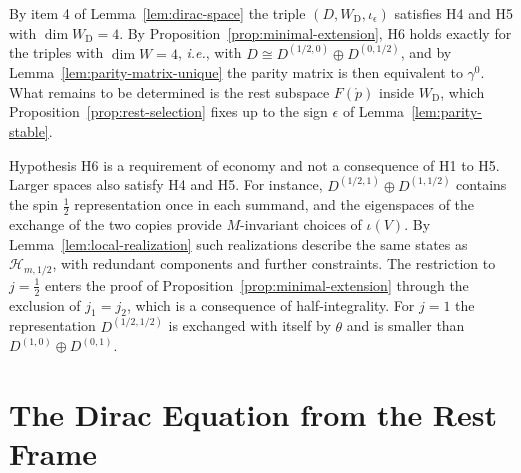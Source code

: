 \begin{remark}\label{rem:minimality-choice}
	By item 4 of Lemma~\ref{lem:dirac-space} the triple $(D,W_{\mathrm{D}},\iota_\epsilon)$ satisfies H4 and H5 with $\dim W_{\mathrm{D}}=4$. By Proposition~\ref{prop:minimal-extension}, H6 holds exactly for the triples with $\dim W=4$, \textit{i.e.}, with $D\cong D^{(1/2,0)}\oplus D^{(0,1/2)}$, and by Lemma~\ref{lem:parity-matrix-unique} the parity matrix is then equivalent to $\gamma^0$. What remains to be determined is the rest subspace $F(\mathring{p})$ inside $W_{\mathrm{D}}$, which Proposition~\ref{prop:rest-selection} fixes up to the sign $\epsilon$ of Lemma~\ref{lem:parity-stable}.
	
	Hypothesis H6 is a requirement of economy and not a consequence of H1 to H5. Larger spaces also satisfy H4 and H5. For instance, $D^{(1/2,1)}\oplus D^{(1,1/2)}$ contains the spin $\frac12$ representation once in each summand, and the eigenspaces of the exchange of the two copies provide $M$-invariant choices of $\iota(V)$. By Lemma~\ref{lem:local-realization} such realizations describe the same states as $\mathcal{H}_{m,1/2}$, with redundant components and further constraints. The restriction to $j=\frac12$ enters the proof of Proposition~\ref{prop:minimal-extension} through the exclusion of $j_1=j_2$, which is a consequence of half-integrality. For $j=1$ the representation $D^{(1/2,1/2)}$ is exchanged with itself by $\theta$ and is smaller than $D^{(1,0)}\oplus D^{(0,1)}$.
\end{remark}

\section{The Dirac Equation from the Rest Frame}
\label{sec:dirac-equation}

